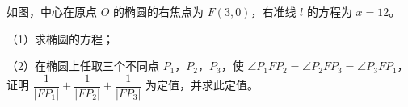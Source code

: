 \begin{question}
如图，中心在原点 $O$ 的椭圆的右焦点为 $F(3,0)$，右准线 $l$ 的方程为 $x=12$。

（1）求椭圆的方程；

（2）在椭圆上任取三个不同点 $P_1$，$P_2$，$P_3$，使 $\angle P_1FP_2=\angle P_2FP_3=\angle P_3FP_1$，证明 $\dfrac1{|FP_1|}+\dfrac1{|FP_2|}+\dfrac1{|FP_3|}$ 为定值，并求此定值。
\nopagebreak[4]
\begin{center}\end{center}
\nopagebreak[4]

\end{question}